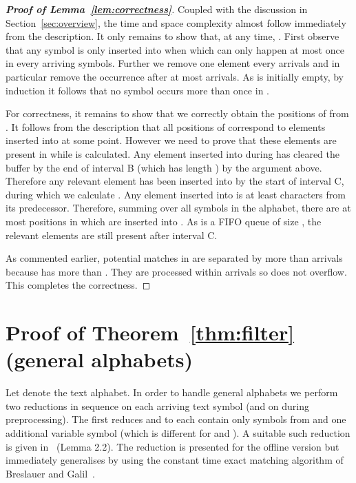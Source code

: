 \documentclass[11pt,a4paper]{article}
\theoremstyle{theorem}
\newcommand{\prooflemma}[1]{\textbf{Proof of Lemma~\ref{#1}}}
\begin{document}
\begin{proof}[\prooflemma{lem:correctness}]
    Coupled with the discussion in Section~\ref{sec:overview}, the time and space complexity almost follow immediately from the description. It only remains to show that, at any time, . First observe that any symbol  is only inserted into  when  which can only happen at most once in every  arriving symbols. Further we remove one element every  arrivals and in particular remove the  occurrence after at most  arrivals. As  is initially empty, by induction it follows that no symbol occurs more than once in .


    For correctness, it remains to show that we correctly obtain the positions of  from . It follows from the description that all positions of  correspond to elements inserted into  at some point. However we need to prove that these elements are present in  while  is calculated. Any element inserted into  during  has cleared the buffer by the end of interval B (which has length ) by the argument above. Therefore any relevant element has been inserted into  by the start of interval C, during which we calculate . Any element inserted into  is at least  characters from its predecessor. Therefore, summing over all symbols in the alphabet, there are at most  positions in  which are inserted into . As  is a FIFO queue of size , the relevant elements are still present after interval C.

    As commented earlier, potential matches in  are separated by more than  arrivals because  has  more than . They are processed within  arrivals so  does not overflow. This completes the correctness.
\end{proof}





\section{Proof of Theorem~\ref{thm:filter} (general alphabets)} \label{appendix:filter}



Let  denote the text alphabet.
In order to handle general alphabets we perform two reductions in sequence on each arriving text symbol (and on  during preprocessing). The first reduces  and  to each contain only symbols from  and one additional variable symbol (which is different for  and ). A suitable such reduction is given in~\cite{AFM:1994} (Lemma 2.2). The reduction is presented for the offline version but immediately generalises by using the constant time exact matching algorithm of Breslauer and Galil~\cite{BG:2011}.
\end{document}
